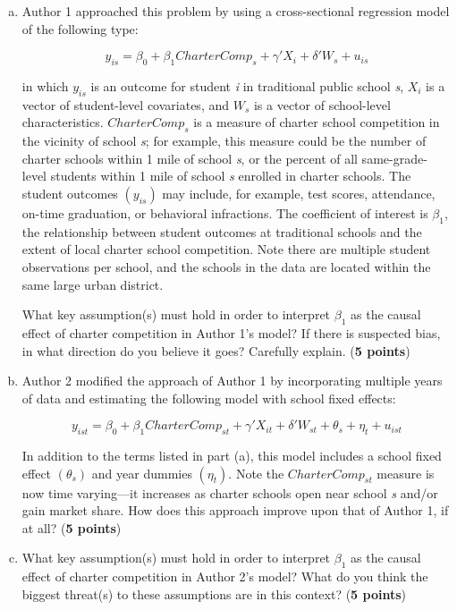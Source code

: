 \documentclass[12pt]{article}
\begin{document}
\begin{enumerate}[(a)]
\setlength\itemsep{1em}
\item Author 1 approached this problem by using a cross-sectional regression model of the following type: 

$$y_{is} = \beta_0 + \beta_1 CharterComp_{s} + \gamma' X_i + \delta' W_s + u_{is}$$

in which $y_{is}$ is an outcome for student \textit{i} in traditional public school \textit{s}, $X_i$ is a vector of student-level covariates, and $W_s$ is a vector of school-level characteristics. $CharterComp_s$ is a measure of charter school competition in the vicinity of school \textit{s}; for example, this measure could be the number of charter schools within 1 mile of school \textit{s}, or the percent of all same-grade-level students within 1 mile of school \textit{s} enrolled in charter schools. The student outcomes $(y_{is})$ may include, for example, test scores, attendance, on-time graduation, or behavioral infractions. The coefficient of interest is $\beta_1$, the relationship between student outcomes at traditional schools and the extent of local charter school competition. Note there are multiple student observations per school, and the schools in the data are located within the same large urban district.
\medskip

What key assumption(s) must hold in order to interpret $\beta_1$ as the causal effect of charter competition in Author 1's model? If there is suspected bias, in what direction do you believe it goes? Carefully explain. ({\bf 5 points})

\medskip

\item Author 2 modified the approach of Author 1 by incorporating multiple years of data and estimating the following model with school fixed effects: 

$$y_{ist} = \beta_0 + \beta_1 CharterComp_{st} + \gamma' X_{it} + \delta' W_{st} + \theta_s + \eta_t + u_{ist}$$

In addition to the terms listed in part (a), this model includes a school fixed effect $(\theta_s)$ and year dummies $(\eta_t)$. Note the $CharterComp_{st}$ measure is now time varying---it increases as charter schools open near school \textit{s} and/or gain market share. How does this approach improve upon that of Author 1, if at all? ({\bf 5 points})
\medskip

\item What key assumption(s) must hold in order to interpret $\beta_1$ as the causal effect of charter competition in Author 2's model? What do you think the biggest threat(s) to these assumptions are in this context? ({\bf 5 points})
\medskip


\end{enumerate}
\end{document}
